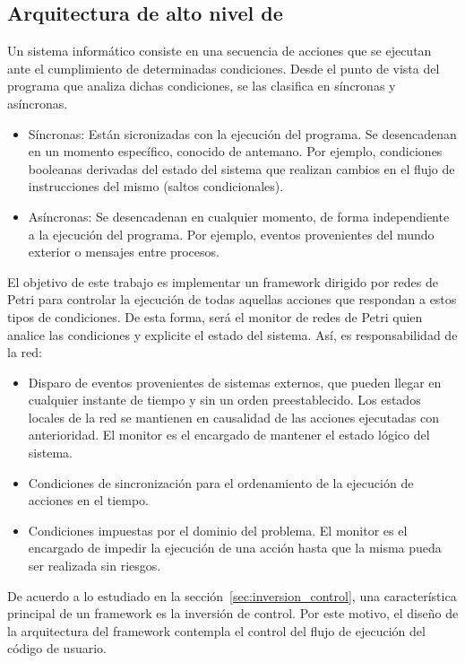 \subsection{Arquitectura de alto nivel de \nombreFramework}
\label{sec:arquitectura_alto_nivel}
Un sistema informático consiste en una secuencia de acciones que se ejecutan
ante el cumplimiento de determinadas condiciones. Desde el punto de vista del
programa que analiza dichas condiciones, se las clasifica en síncronas y asíncronas.
  \begin{itemize}
	\item Síncronas: Están sicronizadas con la ejecución del programa. Se
	desencadenan en un momento específico, conocido de antemano.
	Por ejemplo, condiciones booleanas derivadas del estado del sistema que
	realizan cambios en el flujo de instrucciones del mismo (saltos
	condicionales).
	\item Asíncronas: Se desencadenan en cualquier momento, de forma independiente
	a la ejecución del programa. Por ejemplo, eventos provenientes del mundo
	exterior o mensajes entre procesos.
  \end{itemize}

El objetivo de este trabajo es implementar un framework dirigido por redes de
Petri para controlar la ejecución de todas aquellas acciones que respondan a
estos tipos de condiciones.
De esta forma, será el monitor de redes de Petri quien analice las condiciones y
explicite el estado del sistema. Así, es responsabilidad de la red:
\begin{itemize}
  \item Disparo de eventos provenientes de sistemas externos, que pueden llegar
  en cualquier instante de tiempo y sin un orden preestablecido. Los estados
  locales de la red se mantienen en causalidad de las acciones ejecutadas con
  anterioridad. El monitor es el encargado de mantener el estado lógico del
  sistema.
  
  \item Condiciones de sincronización para el ordenamiento de la ejecución de
  acciones en el tiempo. 
  
  \item Condiciones impuestas por el dominio del problema. El monitor es el
  encargado de impedir la ejecución de una acción hasta que la misma pueda ser
  realizada sin riesgos.
\end{itemize}

De acuerdo a lo estudiado en la sección~\ref{sec:inversion_control}, una
característica principal de un framework es la inversión de control. Por este
motivo, el diseño de la arquitectura del framework contempla el control del
flujo de ejecución del código de usuario.

